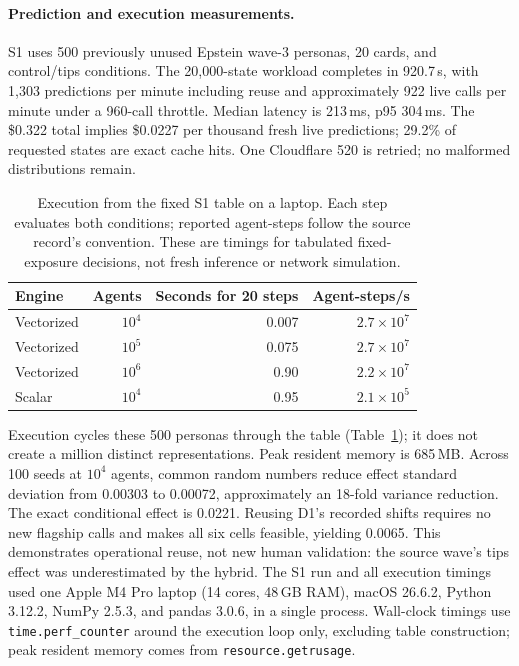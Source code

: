 \documentclass[11pt]{article}
\begin{document}
\paragraph{Prediction and execution measurements.}
S1 uses 500 previously unused Epstein wave-3 personas, 20 cards, and control/tips conditions. The 20,000-state workload completes in 920.7\,s, with 1,303 predictions per minute including reuse and approximately 922 live calls per minute under a 960-call throttle. Median latency is 213\,ms, p95 304\,ms. The \$0.322 total implies \$0.0227 per thousand fresh live predictions; 29.2\% of requested states are exact cache hits. One Cloudflare 520 is retried; no malformed distributions remain.

\begin{table}[tp]
\centering\small
\caption{Execution from the fixed S1 table on a laptop. Each step evaluates both conditions; reported agent-steps follow the source record's convention. These are timings for tabulated fixed-exposure decisions, not fresh inference or network simulation.}
\label{tab:scale}
\begin{tabular}{lrrr}
\toprule
Engine & Agents & Seconds for 20 steps & Agent-steps/s\\
\midrule
Vectorized & $10^4$ & 0.007 & $2.7\times10^7$\\
Vectorized & $10^5$ & 0.075 & $2.7\times10^7$\\
Vectorized & $10^6$ & 0.90 & $2.2\times10^7$\\
Scalar & $10^4$ & 0.95 & $2.1\times10^5$\\
\bottomrule
\end{tabular}
\end{table}

Execution cycles these 500 personas through the table (Table~\ref{tab:scale}); it does not create a million distinct representations. Peak resident memory is 685\,MB. Across 100 seeds at $10^4$ agents, common random numbers reduce effect standard deviation from 0.00303 to 0.00072, approximately an 18-fold variance reduction. The exact conditional effect is 0.0221. Reusing D1's recorded shifts requires no new flagship calls and makes all six cells feasible, yielding 0.0065. This demonstrates operational reuse, not new human validation: the source wave's tips effect was underestimated by the hybrid. The S1 run and all execution timings used one Apple M4 Pro laptop (14 cores, 48\,GB RAM), macOS 26.6.2, Python 3.12.2, NumPy 2.5.3, and pandas 3.0.6, in a single process. Wall-clock timings use \texttt{time.perf\_counter} around the execution loop only, excluding table construction; peak resident memory comes from \texttt{resource.getrusage}.
\end{document}
